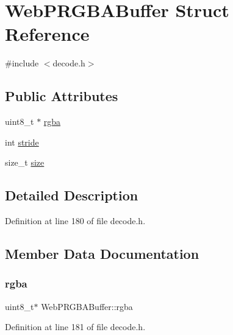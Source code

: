 \hypertarget{struct_web_p_r_g_b_a_buffer}{}\section{Web\+P\+R\+G\+B\+A\+Buffer Struct Reference}
\label{struct_web_p_r_g_b_a_buffer}


{\ttfamily \#include $<$decode.\+h$>$}

\subsection*{Public Attributes}
\begin{DoxyCompactItemize}
\item 
uint8\+\_\+t $\ast$ \mbox{\hyperlink{struct_web_p_r_g_b_a_buffer_a45e4756da4946f214d1cfde6c37631be}{rgba}}
\item 
int \mbox{\hyperlink{struct_web_p_r_g_b_a_buffer_a571fb2a14b6c081aff2076e6e903b874}{stride}}
\item 
size\+\_\+t \mbox{\hyperlink{struct_web_p_r_g_b_a_buffer_a19f883a851a95c2378295e4977f58ae6}{size}}
\end{DoxyCompactItemize}


\subsection{Detailed Description}


Definition at line 180 of file decode.\+h.



\subsection{Member Data Documentation}
\mbox{\label{struct_web_p_r_g_b_a_buffer_a45e4756da4946f214d1cfde6c37631be}} 
\subsubsection{\texorpdfstring{rgba}{rgba}}
{\footnotesize\ttfamily uint8\+\_\+t$\ast$ Web\+P\+R\+G\+B\+A\+Buffer\+::rgba}



Definition at line 181 of file decode.\+h.

\mbox{\label{struct_web_p_r_g_b_a_buffer_a19f883a851a95c2378295e4977f58ae6}} 
